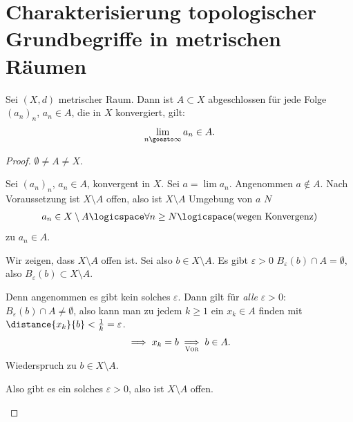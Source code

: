 \section*{Charakterisierung topologischer Grundbegriffe in metrischen Räumen}
\begin{lemma}\label{abgeschlossenheit:folgenkonvergenzkriterium}
    Sei \( (X,d) \) metrischer Raum. 
    Dann ist \( A\subset X \) abgeschlossen \tiff für jede Folge \( (a_n)_n \), \( a_n\in A \), die in \( X \) konvergiert, gilt:
    \begin{align*}
        \lim\limits_{n \goesto \infty} a_n\in A.
    \end{align*}
\end{lemma}
\begin{proof}
    \Obda \( \emptyset\neq A\neq X \).
    
    \begin{proofenumerate}
        
        \item[\hin] Sei \( (a_n)_n \), \( a_n\in A \), konvergent in \( X \).
         Sei \( a=\lim a_n \). Angenommen \( a\notin A \). Nach Voraussetzung ist \( X\setminus A \) offen, also ist \( X\setminus A \) Umgebung von \( a \) \timplies \texists \( N \) \sd
         \begin{align*}
             a_n \in X\setminus A \logicspace \forall n\geq N \logicspace (\text{wegen Konvergenz})
         \end{align*}
         \contra zu \( a_n\in A \).
         
         \item[\rueck] Wir zeigen, dass \( X\setminus A \) offen ist.
         Sei also \( b\in X \setminus A \). Es gibt \( \varepsilon>0 \) \sd \( B_\varepsilon(b)\cap A=\emptyset \), also \( B_\varepsilon(b)\subset X\setminus A \). 
         
         Denn angenommen es gibt kein solches \( \varepsilon \). 
         Dann gilt für \emph{alle} \( \varepsilon>0 \):
         \( B_\varepsilon(b)\cap A\neq \emptyset \), also kann man zu jedem \( k\geq 1 \) ein \( x_k\in A \) finden mit \( \distance{x_k}{ b}<\frac{1}{k}=\varepsilon \).
         \begin{align*}
             \implies x_k=b\underset{\text{\textsc{Vor}}}{\implies} b\in A.
         \end{align*}
         \contra Wiederspruch zu \( b\in X\setminus A \).

         Also gibt es ein solches \( \varepsilon>0 \), also ist \( X\setminus A \) offen.
    \end{proofenumerate}
    
\end{proof}
